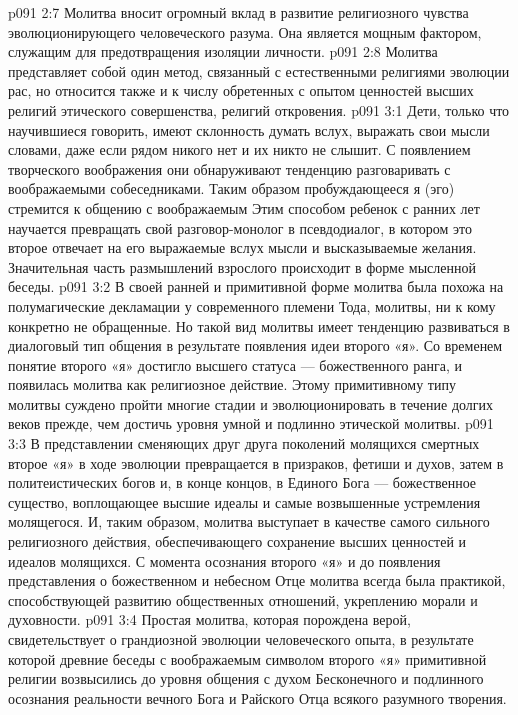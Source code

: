 \vs p091 2:7 Молитва вносит огромный вклад в развитие религиозного чувства эволюционирующего человеческого разума. Она является мощным фактором, служащим для предотвращения изоляции личности.
\vs p091 2:8 Молитва представляет собой один метод, связанный с естественными религиями эволюции рас, но относится также и к числу обретенных с опытом ценностей высших религий этического совершенства, религий откровения.
\vs p091 3:1 Дети, только что научившиеся говорить, имеют склонность думать вслух, выражать свои мысли словами, даже если рядом никого нет и их никто не слышит. С появлением творческого воображения они обнаруживают тенденцию разговаривать с воображаемыми собеседниками. Таким образом пробуждающееся я (эго) стремится к общению с воображаемым  Этим способом ребенок с ранних лет научается превращать свой разговор\hyp{}монолог в псевдодиалог, в котором это второе  отвечает на его выражаемые вслух мысли и высказываемые желания. Значительная часть размышлений взрослого происходит в форме мысленной беседы.
\vs p091 3:2 В своей ранней и примитивной форме молитва была похожа на полумагические декламации у современного племени Тода, молитвы, ни к кому конкретно не обращенные. Но такой вид молитвы имеет тенденцию развиваться в диалоговый тип общения в результате появления идеи второго «я». Со временем понятие второго «я» достигло высшего статуса --- божественного ранга, и появилась молитва как религиозное действие. Этому примитивному типу молитвы суждено пройти многие стадии и эволюционировать в течение долгих веков прежде, чем достичь уровня умной и подлинно этической молитвы.
\vs p091 3:3 В представлении сменяющих друг друга поколений молящихся смертных второе «я» в ходе эволюции превращается в призраков, фетиши и духов, затем в политеистических богов и, в конце концов, в Единого Бога --- божественное существо, воплощающее высшие идеалы и самые возвышенные устремления молящегося. И, таким образом, молитва выступает в качестве самого сильного религиозного действия, обеспечивающего сохранение высших ценностей и идеалов молящихся. С момента осознания второго «я» и до появления представления о божественном и небесном Отце молитва всегда была практикой, способствующей развитию общественных отношений, укреплению морали и духовности.
\vs p091 3:4 Простая молитва, которая порождена верой, свидетельствует о грандиозной эволюции человеческого опыта, в результате которой древние беседы с воображаемым символом второго «я» примитивной религии возвысились до уровня общения с духом Бесконечного и подлинного осознания реальности вечного Бога и Райского Отца всякого разумного творения.
